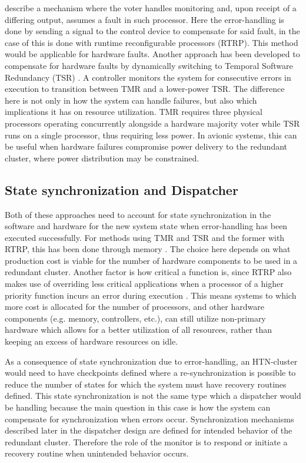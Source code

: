 \cite{bonna_triple_2019} describe a mechanism where the voter handles monitoring and, upon receipt of a differing output, assumes a fault in such processor. Here the error-handling is done by sending a signal to the control device to compensate for said fault, in the case of \cite{bonna_triple_2019} this is done with runtime reconfigurable processors (RTRP). This method would be applicable for hardware faults. Another approach has been developed to compensate for hardware faults by dynamically switching to Temporal Software Redundancy (TSR) \parencite{hamilton_adaptive-hybrid_2019}. A controller monitors the system for consecutive errors in execution to transition between TMR and a lower-power TSR. The difference here is not only in how the system can handle failures, but also which implications it has on resource utilization. TMR requires three physical processors operating concurrently alongside a hardware majority voter while TSR runs on a single processor, thus requiring less power. In avionic systems, this can be useful when hardware failures compromise power delivery to the redundant cluster, where power distribution may be constrained.

\subsection{State synchronization and Dispatcher}

Both of these approaches need to account for state synchronization in the software and hardware for the new system state when error-handling has been executed successfully. For methods using TMR and TSR and the former with RTRP, this has been done through memory \parencite{bonna_triple_2019, hamilton_adaptive-hybrid_2019}. The choice here depends on what production cost is viable for the number of hardware components to be used in a redundant cluster. Another factor is how critical a function is, since RTRP also makes use of overriding less critical applications when a processor of a higher priority function incurs an error during execution \parencite{bonna_triple_2019}. This means systems to which more cost is allocated for the number of processors, and other hardware components (e.g. memory, controllers, etc.), can still utilize non-primary hardware which allows for a better utilization of all resources, rather than keeping an excess of hardware resources on idle.

As a consequence of state synchronization due to error-handling, an HTN-cluster would need to have checkpoints defined where a re-synchronization is possible to reduce the number of states for which the system must have recovery routines defined. This state synchronization is not the same type which a dispatcher would be handling because the main question in this case is how the system can compensate for synchronization when errors occur. Synchronization mechanisms described later in the dispatcher design are defined for intended behavior of the redundant cluster. Therefore the role of the monitor is to respond or initiate a recovery routine when unintended behavior occurs.

